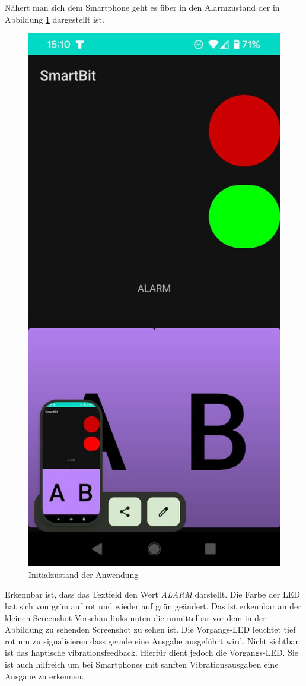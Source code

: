 \documentclass[11pt,a4paper]{report}
\begin{document}
Nähert man sich dem Smartphone geht es über in den Alarmzustand der in Abbildung \ref{fig:app_alarm} dargestellt ist.
\begin{figure}[htbp]
  \centering
  \includegraphics[height=0.4\textheight]{images/app_alarm}
  \caption{Initialzustand der Anwendung}
  \label{fig:app_alarm}
\end{figure}
Erkennbar ist, dass das Textfeld den Wert \textit{ALARM} darstellt.
Die Farbe der LED hat sich von grün auf rot und wieder auf grün geändert.
Das ist erkennbar an der kleinen Screenshot-Vorschau links unten die unmittelbar vor dem in der Abbildung zu sehenden Screenshot zu sehen ist.
Die Vorgangs-LED leuchtet tief rot um zu signalisieren dass gerade eine Ausgabe ausgeführt wird.
Nicht sichtbar ist das haptische vibrationsfeedback.
Hierfür dient jedoch die Vorgangs-LED.
Sie ist auch hilfreich um bei Smartphones mit sanften Vibrationsausgaben eine Ausgabe zu erkennen.
\end{document}
